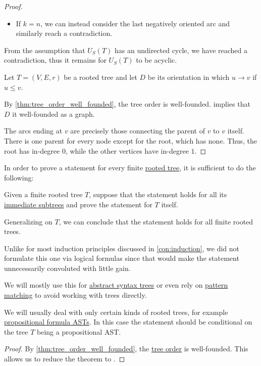 \begin{proof}
\begin{itemize}
    \item If \( k = n \), we can instead consider the last negatively oriented arc and similarly reach a contradiction.
  \end{itemize}

  From the assumption that \( U_S(T) \) has an undirected cycle, we have reached a contradiction, thus it remains for \( U_S(T) \) to be acyclic.

   Let \( T = (V, E, r) \) be a rooted tree and let \( D \) be its orientation in which \( u \to v \) if \( u \leq v \).

   By \cref{thm:tree_order_well_founded}, the tree order is well-founded.  implies that \( D \) it well-founded as a graph.

   The arcs ending at \( v \) are precisely those connecting the parent of \( v \) to \( v \) itself. There is one parent for every node except for the root, which has none. Thus, the root has in-degree \( 0 \), while the other vertices have in-degree \( 1 \).
\end{proof}

\begin{theorem}\label{thm:induction_on_rooted_trees}\mimprovised
  In order to prove a statement for every finite \hyperref[def:rooted_tree]{rooted tree}, it is sufficient to do the following:
  \begin{displayquote}
    Given a finite rooted tree \( T \), suppose that the statement holds for all its \hyperref[def:rooted_tree/subtree]{immediate subtrees} and prove the statement for \( T \) itself.
  \end{displayquote}

  Generalizing on \( T \), we can conclude that the statement holds for all finite rooted trees.
\end{theorem}
\begin{comments}
  \item Unlike for most induction principles discussed in \cref{con:induction}, we did not formulate this one via logical formulas since that would make the statement unnecessarily convoluted with little gain.

  \item We will mostly use this for \hyperref[con:abstract_syntax_tree]{abstract syntax trees} or even rely on \hyperref[con:evaluation]{pattern matching} to avoid working with trees directly.

  \item We will usually deal with only certain kinds of rooted trees, for example \hyperref[def:propositional_formula_ast]{propositional formula ASTs}. In this case the statement should be conditional on the tree \( T \) being a propositional AST.
\end{comments}
\begin{proof}
  By \cref{thm:tree_order_well_founded}, the \hyperref[def:rooted_tree]{tree order} is well-founded. This allows us to reduce the theorem to .
\end{proof}

